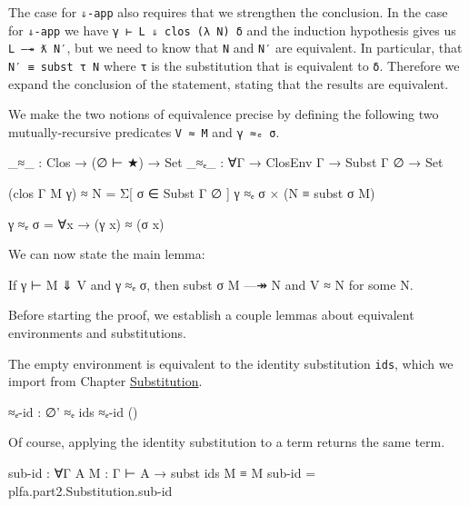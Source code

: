 The case for \texttt{⇓-app} also requires that we strengthen the
conclusion. In the case for \texttt{⇓-app} we have
\texttt{γ\ ⊢\ L\ ⇓\ clos\ (λ\ N)\ δ} and the induction hypothesis gives
us \texttt{L\ —↠\ ƛ\ N′}, but we need to know that \texttt{N} and
\texttt{N′} are equivalent. In particular, that
\texttt{N′\ ≡\ subst\ τ\ N} where \texttt{τ} is the substitution that is
equivalent to \texttt{δ}. Therefore we expand the conclusion of the
statement, stating that the results are equivalent.

We make the two notions of equivalence precise by defining the following
two mutually-recursive predicates \texttt{V\ ≈\ M} and
\texttt{γ\ ≈ₑ\ σ}.

\begin{fence}
\begin{code}
_≈_ : Clos → (∅ ⊢ ★) → Set
_≈ₑ_ : ∀{Γ} → ClosEnv Γ → Subst Γ ∅ → Set

(clos {Γ} M γ) ≈ N = Σ[ σ ∈ Subst Γ ∅ ] γ ≈ₑ σ × (N ≡ subst σ M)

γ ≈ₑ σ = ∀{x} → (γ x) ≈ (σ x)
\end{code}
\end{fence}

We can now state the main lemma:

\begin{myDisplay}
If γ ⊢ M ⇓ V  and  γ ≈ₑ σ,
then  subst σ M —↠ N  and  V ≈ N  for some N.
\end{myDisplay}

Before starting the proof, we establish a couple lemmas about equivalent
environments and substitutions.

The empty environment is equivalent to the identity substitution
\texttt{ids}, which we import from Chapter
\protect\hyperlink{Substitution}{Substitution}.

\begin{fence}
\begin{code}
≈ₑ-id : ∅' ≈ₑ ids
≈ₑ-id {()}
\end{code}
\end{fence}

Of course, applying the identity substitution to a term returns the same
term.

\begin{fence}
\begin{code}
sub-id : ∀{Γ} {A} {M : Γ ⊢ A} → subst ids M ≡ M
sub-id = plfa.part2.Substitution.sub-id
\end{code}
\end{fence}

